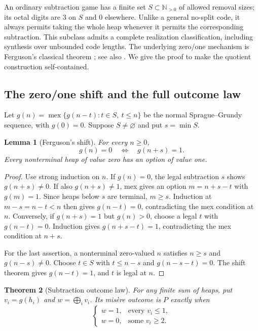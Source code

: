 \documentclass[11pt]{article}
\newtheorem{theorem}{Theorem}[section]
\newtheorem{lemma}[theorem]{Lemma}
\theoremstyle{definition}
\theoremstyle{remark}
\newcommand{\N}{\mathbb N}
\begin{document}
An ordinary subtraction game has a finite set $S\subset\N_{>0}$ of
allowed removal sizes; its octal digits are $3$ on $S$ and $0$ elsewhere.
Unlike a general no-split code, it always permits taking the whole heap
whenever it permits the corresponding subtraction.  This subclass admits a
complete realization classification, including synthesis over unbounded code
lengths.  The underlying zero/one mechanism is Ferguson's classical theorem
\cite{ferguson1974}; see also \cite[Section~6.2]{gurvichho2018}.
We give the proof to make the quotient construction self-contained.

\subsection{The zero/one shift and the full outcome law}

Let $g(n)=\operatorname{mex}\{g(n-t):t\in S,\ t\le n\}$ be the normal
Sprague--Grundy sequence, with $g(0)=0$.  Suppose $S\ne\varnothing$ and
put $s=\min S$.

\begin{lemma}[Ferguson's shift]\label{lem:ferguson}
For every $n\ge0$,
\[
 g(n)=0\quad\Longleftrightarrow\quad g(n+s)=1.
\]
Every nonterminal heap of value zero has an option of value one.
\end{lemma}

\begin{proof}
Use strong induction on $n$.  If $g(n)=0$, the legal subtraction $s$ shows
$g(n+s)\ne0$.  If also $g(n+s)\ne1$, mex gives an option
$m=n+s-t$ with $g(m)=1$.  Since heaps below $s$ are terminal, $m\ge s$.
Induction at $m-s=n-t<n$ then gives $g(n-t)=0$, contradicting the mex
condition at $n$.  Conversely, if $g(n+s)=1$ but $g(n)>0$, choose a legal
$t$ with $g(n-t)=0$.  Induction gives $g(n+s-t)=1$, contradicting the mex
condition at $n+s$.

For the last assertion, a nonterminal zero-valued $n$ satisfies $n\ge s$
and $g(n-s)\ne0$.  Choose $t\in S$ with $t\le n-s$ and
$g(n-s-t)=0$.  The shift theorem gives $g(n-t)=1$, and $t$ is legal at $n$.
\end{proof}

\begin{theorem}[Subtraction outcome law]\label{thm:subtraction-outcome}
For any finite sum of heaps, put $v_i=g(h_i)$ and
$w=\bigoplus_i v_i$.  Its mis\`ere outcome is $P$ exactly when
\[
 \begin{cases}
 w=1,&\text{every }v_i\le1,\\
 w=0,&\text{some }v_i\ge2.
 \end{cases}
\]
\end{theorem}
\end{document}

